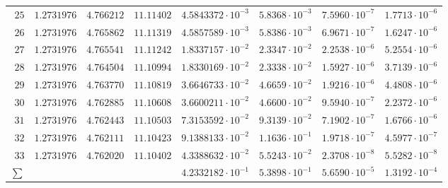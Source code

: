 {\begin{longtable}{@{}rrrrrrrr@{}}
$25$ & $1.2731976$ & $4.766212$ & $11.11402$ & $4.5843372\cdot10^{-3}$ & $5.8368\cdot10^{-3}$ & $7.5960\cdot10^{-7}$ & $1.7713\cdot10^{-6}$\\
$26$ & $1.2731976$ & $4.765862$ & $11.11319$ & $4.5857589\cdot10^{-3}$ & $5.8386\cdot10^{-3}$ & $6.9671\cdot10^{-7}$ & $1.6247\cdot10^{-6}$\\
$27$ & $1.2731976$ & $4.765541$ & $11.11242$ & $1.8337157\cdot10^{-2}$ & $2.3347\cdot10^{-2}$ & $2.2538\cdot10^{-6}$ & $5.2554\cdot10^{-6}$\\
$28$ & $1.2731976$ & $4.764504$ & $11.10994$ & $1.8330169\cdot10^{-2}$ & $2.3338\cdot10^{-2}$ & $1.5927\cdot10^{-6}$ & $3.7139\cdot10^{-6}$\\
$29$ & $1.2731976$ & $4.763770$ & $11.10819$ & $3.6646733\cdot10^{-2}$ & $4.6659\cdot10^{-2}$ & $1.9216\cdot10^{-6}$ & $4.4808\cdot10^{-6}$\\
$30$ & $1.2731976$ & $4.762885$ & $11.10608$ & $3.6600211\cdot10^{-2}$ & $4.6600\cdot10^{-2}$ & $9.5940\cdot10^{-7}$ & $2.2372\cdot10^{-6}$\\
$31$ & $1.2731976$ & $4.762443$ & $11.10503$ & $7.3153592\cdot10^{-2}$ & $9.3139\cdot10^{-2}$ & $7.1902\cdot10^{-7}$ & $1.6766\cdot10^{-6}$\\
$32$ & $1.2731976$ & $4.762111$ & $11.10423$ & $9.1388133\cdot10^{-2}$ & $1.1636\cdot10^{-1}$ & $1.9718\cdot10^{-7}$ & $4.5977\cdot10^{-7}$\\
$33$ & $1.2731976$ & $4.762020$ & $11.10402$ & $4.3388632\cdot10^{-2}$ & $5.5243\cdot10^{-2}$ & $2.3708\cdot10^{-8}$ & $5.5282\cdot10^{-8}$\\
\midrule
$\sum$ &  &  &  & $4.2332182\cdot10^{-1}$ & $5.3898\cdot10^{-1}$ & $5.6590\cdot10^{-5}$ & $1.3192\cdot10^{-4}$\\
\end{longtable}
}

